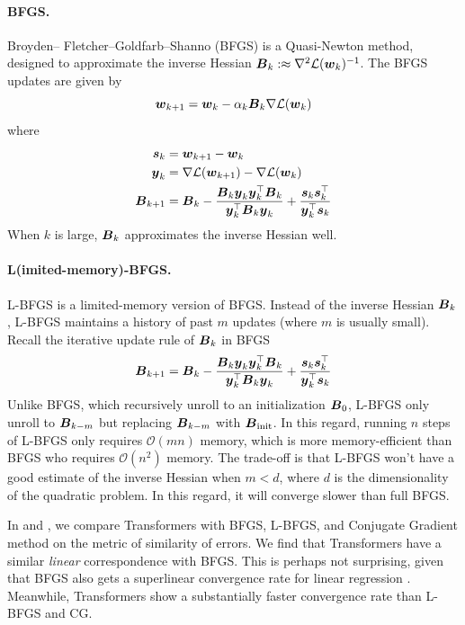 \paragraph{BFGS. } Broyden– Fletcher–Goldfarb–Shanno (BFGS) is a Quasi-Newton method, designed to approximate the inverse Hessian $\boldsymbol{B}_k :\approx \nabla^2 \mathcal L(\boldsymbol{w}_k)^{-1}$. The BFGS updates are given by
\begin{equation}
    \boldsymbol{w}_{k+1} = \boldsymbol{w}_k - \alpha_k \boldsymbol{B}_k \nabla \mathcal L(\boldsymbol{w}_k)
\end{equation}
where 
\begin{equation*}
    \begin{aligned}
    \boldsymbol{s}_k &= \boldsymbol{w}_{k+1} - \boldsymbol{w}_k \\
    \boldsymbol{y}_k &= \nabla \mathcal L(\boldsymbol{w}_{k+1}) - \nabla \mathcal L(\boldsymbol{w}_{k}) \\
    \boldsymbol{B}_{k+1} &= \boldsymbol{B}_k - \frac{\boldsymbol{B}_k \boldsymbol{y}_k \boldsymbol{y}_k^\top \boldsymbol{B}_k}{\boldsymbol{y}_k^\top \boldsymbol{B}_k \boldsymbol{y}_k} + \frac{\boldsymbol{s}_k \boldsymbol{s}_k^\top}{\boldsymbol{y}_k^\top \boldsymbol{s}_k}
    \end{aligned}
\end{equation*}
When $k$ is large, $\boldsymbol{B}_k$ approximates the inverse Hessian well.

\paragraph{L(imited-memory)-BFGS.} L-BFGS is a limited-memory version of BFGS. Instead of the inverse Hessian $\boldsymbol{B}_k$, L-BFGS maintains a history of past $m$ updates (where $m$ is usually small). Recall the iterative update rule of $\boldsymbol{B}_k$ in BFGS
\begin{equation}
    \boldsymbol{B}_{k+1} = \boldsymbol{B}_k - \frac{\boldsymbol{B}_k \boldsymbol{y}_k \boldsymbol{y}_k^\top \boldsymbol{B}_k}{\boldsymbol{y}_k^\top \boldsymbol{B}_k \boldsymbol{y}_k} + \frac{\boldsymbol{s}_k \boldsymbol{s}_k^\top}{\boldsymbol{y}_k^\top \boldsymbol{s}_k}
\end{equation}
Unlike BFGS, which recursively unroll to an initialization $\boldsymbol{B}_0$, L-BFGS only unroll to $\boldsymbol{B}_{k-m}$ but replacing $\boldsymbol{B}_{k-m}$ with $\boldsymbol{B}_\mathrm{init}$. In this regard, running $n$ steps of L-BFGS only requires $\mathcal O(mn)$ memory, which is more memory-efficient than BFGS who requires $\mathcal O(n^2)$ memory. The trade-off is that L-BFGS won't have a good estimate of the inverse Hessian when $m < d$, where $d$ is the dimensionality of the quadratic problem. In this regard, it will converge slower than full BFGS. 

In  and , we compare Transformers with BFGS, L-BFGS, and Conjugate Gradient method on the metric of similarity of errors. We find that Transformers have a similar \textit{linear} correspondence with BFGS. This is perhaps not surprising, given that BFGS also gets a superlinear convergence rate for linear regression \cite{nocedal1999numerical}. Meanwhile, Transformers show a substantially faster convergence rate than L-BFGS and CG.


